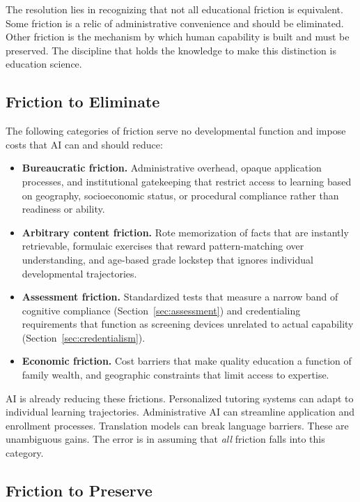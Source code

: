 \documentclass[12pt]{article}
\begin{document}
The resolution lies in recognizing that not all educational friction is equivalent. Some friction is a relic of administrative convenience and should be eliminated. Other friction is the mechanism by which human capability is built and must be preserved. The discipline that holds the knowledge to make this distinction is education science.

\subsection{Friction to Eliminate}
\label{sec:eliminate}

The following categories of friction serve no developmental function and impose costs that AI can and should reduce:

\begin{itemize}[leftmargin=*]
    \item \textbf{Bureaucratic friction.} Administrative overhead, opaque application processes, and institutional gatekeeping that restrict access to learning based on geography, socioeconomic status, or procedural compliance rather than readiness or ability.
    \item \textbf{Arbitrary content friction.} Rote memorization of facts that are instantly retrievable, formulaic exercises that reward pattern-matching over understanding, and age-based grade lockstep that ignores individual developmental trajectories.
    \item \textbf{Assessment friction.} Standardized tests that measure a narrow band of cognitive compliance (Section~\ref{sec:assessment}) and credentialing requirements that function as screening devices unrelated to actual capability (Section~\ref{sec:credentialism}).
    \item \textbf{Economic friction.} Cost barriers that make quality education a function of family wealth, and geographic constraints that limit access to expertise.
\end{itemize}

AI is already reducing these frictions. Personalized tutoring systems can adapt to individual learning trajectories. Administrative AI can streamline application and enrollment processes. Translation models can break language barriers. These are unambiguous gains. The error is in assuming that \emph{all} friction falls into this category.

\subsection{Friction to Preserve}
\label{sec:preserve}
\end{document}
